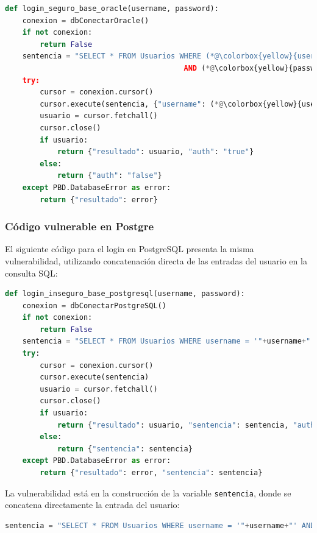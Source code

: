 \documentclass[a4paper,12pt]{article}
\begin{document}
\begin{lstlisting}[language=Python]
def login_seguro_base_oracle(username, password):
    conexion = dbConectarOracle()
    if not conexion:
        return False
    sentencia = "SELECT * FROM Usuarios WHERE (*@\colorbox{yellow}{username = :username}@*)
                                         AND (*@\colorbox{yellow}{password = :password}@*)"
    try:
        cursor = conexion.cursor()
        cursor.execute(sentencia, {"username": (*@\colorbox{yellow}{username}@*), "password": (*@\colorbox{yellow}{password}@*)})
        usuario = cursor.fetchall()
        cursor.close()
        if usuario:
            return {"resultado": usuario, "auth": "true"}
        else:
            return {"auth": "false"}
    except PBD.DatabaseError as error:
        return {"resultado": error}
\end{lstlisting}

\subsubsection{Código vulnerable en Postgre}

El siguiente código para el login en PostgreSQL presenta la misma vulnerabilidad, utilizando concatenación directa de las entradas del usuario en la consulta SQL:

\begin{lstlisting}[language=Python]
def login_inseguro_base_postgresql(username, password):
    conexion = dbConectarPostgreSQL()
    if not conexion:
        return False
    sentencia = "SELECT * FROM Usuarios WHERE username = '"+username+"' AND password = '"+password+"'"
    try:
        cursor = conexion.cursor()
        cursor.execute(sentencia)
        usuario = cursor.fetchall()
        cursor.close()
        if usuario:
            return {"resultado": usuario, "sentencia": sentencia, "auth": "true"}
        else:
            return {"sentencia": sentencia}
    except PBD.DatabaseError as error:
        return {"resultado": error, "sentencia": sentencia}
\end{lstlisting}

La vulnerabilidad está en la construcción de la variable \texttt{sentencia}, donde se concatena directamente la entrada del usuario:

\begin{lstlisting}[language=Python]
sentencia = "SELECT * FROM Usuarios WHERE username = '"+username+"' AND password = '"+password+"'"
\end{lstlisting}
\end{document}
